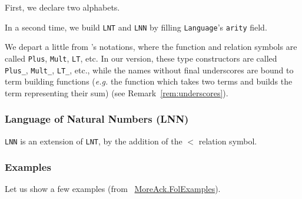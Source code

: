 First, we declare two alphabets.


In a second time, we build \texttt{LNT} and \texttt{LNN} by filling \texttt{Language}'s \texttt{arity} field.


\begin{remark}
  We depart a little from \cite{Goedel}'s notations, where the 
function and relation symbols are called \texttt{Plus}, 
\texttt{Mult}, \texttt{LT}, etc. In our version, these type constructors are called \texttt{Plus\_}, 
\texttt{Mult\_}, \texttt{LT\_}, etc., while the names without final underscores are bound to term building functions (\emph{e.g.}
the function which takes two terms and builds the term representing their sum) (see Remark~\ref{rem:underscores}).
\end{remark}


\subsubsection{Language of Natural Numbers (LNN)}

\texttt{LNN} is an extension of \texttt{LNT}, by the addition 
of the $<$ relation symbol.





\subsubsection{Examples}

Let us show a few examples (from ~\href{../theories/html/hydras.MoreAck.FolExamples.html}{MoreAck.FolExamples}).

 










